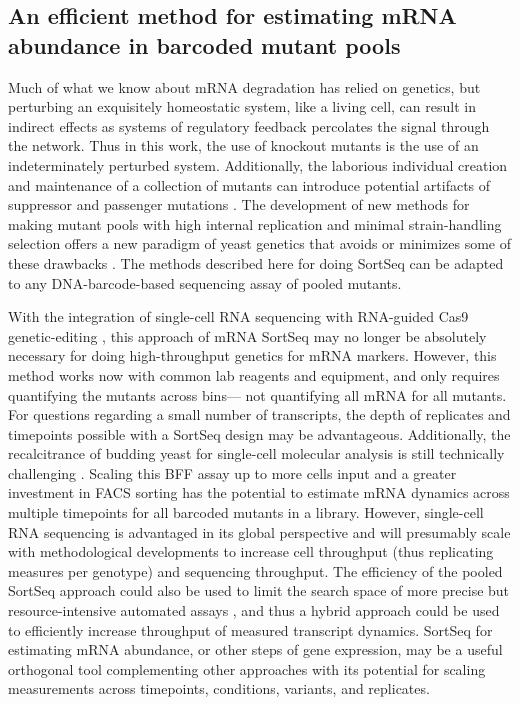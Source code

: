 \subsection{An efficient method for estimating mRNA abundance in
barcoded mutant pools}

Much of what we know about mRNA degradation has relied on genetics,
but perturbing an exquisitely homeostatic system, like a living cell, 
can result in indirect effects as systems of regulatory feedback 
percolates the signal through the network. 
Thus in this work, the use of knockout mutants is the use of
an indeterminately perturbed system. 
Additionally, the laborious individual creation and maintenance of a 
collection of mutants can introduce potential artifacts of suppressor 
and passenger mutations \parencite{kwan2016rdna,markowitz2017reduced}.
The development of new methods for making mutant pools with 
high internal replication and minimal strain-handling selection
offers a new paradigm of yeast genetics that avoids or
minimizes some of these drawbacks \parencite{smith2016quantitative}.
The methods described here for doing SortSeq can be adapted
to any DNA-barcode-based sequencing assay of pooled mutants. 

With the integration of single-cell RNA sequencing with 
RNA-guided Cas9 genetic-editing 
\parencite{dixit2016perturb,hill2018design},
this approach of mRNA SortSeq may no longer be absolutely
necessary for doing high-throughput genetics for mRNA markers. 
However, this method works now with common lab reagents and equipment, 
and only requires quantifying the mutants across bins---
not quantifying all mRNA for all mutants.
For questions regarding a small number of transcripts,
the depth of replicates and timepoints possible with a SortSeq
design may be advantageous.
Additionally, the recalcitrance of budding yeast for 
single-cell molecular analysis is still technically challenging
\parencite{gasch2017single}.
Scaling this BFF assay up to more cells input and a greater investment
in FACS sorting \parencite{de2017deciphering} has the potential to 
estimate mRNA dynamics across multiple
timepoints for all barcoded mutants in a library.
However, single-cell RNA sequencing is advantaged in its global 
perspective and will presumably scale with methodological 
developments to increase cell throughput 
(thus replicating measures per genotype)
and sequencing throughput.
The efficiency of the pooled SortSeq approach could also be used to 
limit the search space of more precise but resource-intensive 
automated assays \parencite{worley2016genome}, 
and thus a hybrid approach could be used to
efficiently increase throughput of measured transcript dynamics. 
SortSeq for estimating mRNA abundance, or other steps of gene
expression, may be a useful orthogonal tool complementing
other approaches with its potential for scaling measurements across
timepoints, conditions, variants, and replicates.

